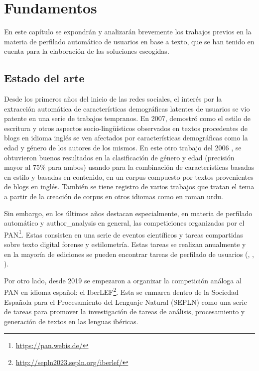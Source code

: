 \chapter{Fundamentos}
\label{chap:fundamentos}
En este capítulo se expondrán y analizarán brevemente los trabajos previos en la materia de perfilado automático de usuarios en base a texto, que se han tenido en cuenta para la elaboración de las soluciones escogidas.
\section{Estado del arte}%
\label{sec:estado_arte}
Desde los primeros años del inicio de las redes sociales, el interés por la extracción automática de características demográficas latentes de usuarios se vio patente en una serie de trabajos tempranos. En 2007, \cite{ap_argamon_07} demostró como el estilo de escritura y otros aspectos socio-lingüísticos observados en textos procedentes de blogs en idioma inglés se ven afectados por características demográficas como la edad y género de los autores de los mismos. En este otro trabajo del 2006 \cite{ap_argamon_06}, se obtuvieron buenos resultados en la clasificación de género y edad (precisión mayor al 75\% para ambos) usando para la combinación de características basadas en estilo y basadas en contenido, en un corpus compuesto por textos provenientes de blogs en inglés. También se  tiene registro de varios trabajos que tratan el tema a partir de la creación de corpus en otros idiomas como \cite{profiling_urdu} en roman urdu.

Sin embargo, en los últimos años destacan especialmente, en materia de perfilado automático y \gls{author_analysis} en general, las competiciones organizadas por el PAN\footnote{\url{https://pan.webis.de/}}. Estas consisten en una serie de eventos científicos y tareas compartidas sobre texto digital forense y estilometría. Estas tareas se realizan anualmente y en la mayoría de ediciones se pueden encontrar tareas de perfilado de usuarios (\cite{pan:2014}, \cite{pan:2015}, \cite{pan:2016}).

Por otro lado, desde 2019 se empezaron a organizar la competición análoga al PAN en idioma español: el IberLEF\footnote{\url{http://sepln2023.sepln.org/iberlef/}}. Esta se enmarca dentro de la Sociedad Española para el Procesamiento del Lenguaje Natural (SEPLN) como una serie de tareas para promover la investigación de tareas de análisis, procesamiento y generación de textos en las lenguas ibéricas.

